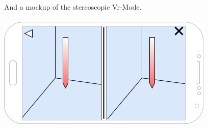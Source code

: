 And a mockup of the stereoscopic Vr-Mode.
\\
\\
\includegraphics[scale=0.5]{pics/VRView_mockup.jpg}
